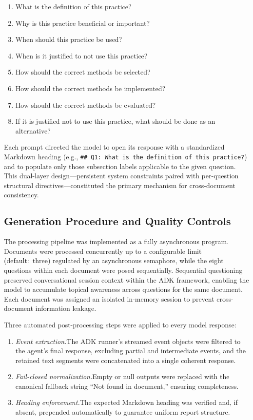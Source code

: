 \documentclass[12pt, a4paper]{article}
\begin{document}
\begin{enumerate}[nosep]
  \item What is the definition of this practice?
  \item Why is this practice beneficial or important?
  \item When should this practice be used?
  \item When is it justified to not use this practice?
  \item How should the correct methods be selected?
  \item How should the correct methods be implemented?
  \item How should the correct methods be evaluated?
  \item If it is justified not to use this practice, what should be done as an alternative?
\end{enumerate}

\noindent Each prompt directed the model to open its response with a standardized Markdown heading (e.g., \texttt{\#\#~Q1:~What is the definition of this practice?}) and to populate only those subsection labels applicable to the given question. This dual-layer design---persistent system constraints paired with per-question structural directives---constituted the primary mechanism for cross-document consistency.

\subsection*{Generation Procedure and Quality Controls}

The processing pipeline was implemented as a fully asynchronous program. Documents were processed concurrently up to a configurable limit (default:~three) regulated by an asynchronous semaphore, while the eight questions within each document were posed sequentially. Sequential questioning preserved conversational session context within the ADK framework, enabling the model to accumulate topical awareness across questions for the same document. Each document was assigned an isolated in-memory session to prevent cross-document information leakage.

Three automated post-processing steps were applied to every model response:

\begin{enumerate}[nosep]
  \item \emph{Event extraction.}\enspace The ADK runner's streamed event objects were filtered to the agent's final response, excluding partial and intermediate events, and the retained text segments were concatenated into a single coherent response.
  \item \emph{Fail-closed normalization.}\enspace Empty or null outputs were replaced with the canonical fallback string ``Not found in document,'' ensuring completeness.
  \item \emph{Heading enforcement.}\enspace The expected Markdown heading was verified and, if absent, prepended automatically to guarantee uniform report structure.
\end{enumerate}
\end{document}
